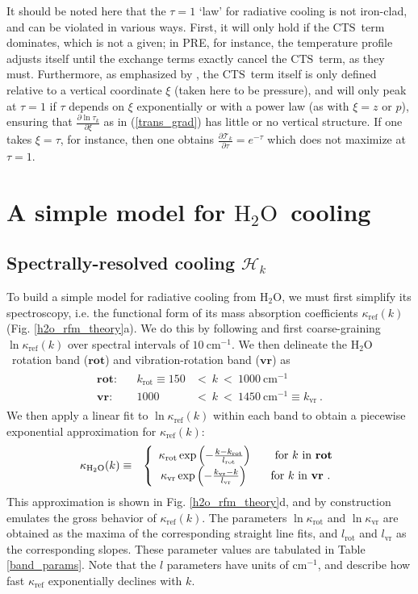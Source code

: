 \documentclass{ametsoc}
\newcommand{\beqa}{\begin{eqnarray}}
\newcommand{\eeqa}{\end{eqnarray}}
\newcommand{\eqnref}[1]{(\ref{#1})}
\newcommand{\cminverse}{\ensuremath{\mathrm{cm^{-1}}}}
\newcommand{\partialder}[2]{\ensuremath{\frac{\partial #1}{\partial #2}}}
\newcommand{\htwo}{\ensuremath{\mathrm{H_2O}}}
\newcommand{\trans}{\ensuremath{\mathcal{T}}}
\newcommand{\ch}{\ensuremath{\mathcal{H}}}
\newcommand{\chk}{\ensuremath{\ch_k}}
\newcommand{\tauk}{\ensuremath{\tau_k}}
\newcommand{\CTS}{\ensuremath{\mathrm{CTS}}}
\newcommand{\kapparef}{\ensuremath{\kappa_{\mathrm{ref}}}}
\newcommand{\kapparot}{\ensuremath{\kappa_{\mathrm{rot}}}}
\newcommand{\kappavr}{\ensuremath{\kappa_{\mathrm{vr}}}}
\newcommand{\krot}{\ensuremath{k_\mathrm{rot}}}
\newcommand{\kvr}{\ensuremath{k_\mathrm{vr}}}
\newcommand{\lrot}{\ensuremath{l_\mathrm{rot}}}
\newcommand{\lvr}{\ensuremath{l_\mathrm{vr}}}
\newcommand{\vr}{\ensuremath{\mathbf{vr}}}
\newcommand{\rot}{\ensuremath{\mathbf{rot}}}
\begin{document}
 It should be noted here that the $\tau=1$ `law' for radiative cooling is not iron-clad, and can be violated in various ways. First, it will only hold if the \CTS\ term dominates, which is not a given; in PRE, for instance, the temperature profile adjusts itself until the exchange terms exactly cancel the \CTS\ term, as they must. Furthermore,  as emphasized by \cite{huang2014}, the \CTS\ term itself is only defined relative to a vertical coordinate $\xi$ (taken here to be pressure),  and  will only peak at $\tau=1$ if $\tau$ depends on $\xi$ exponentially or with a power law (as with $\xi=z$ or $p$), ensuring that $\partialder{\ln \tauk}{\xi}$ as in \eqnref{trans_grad} has little or no vertical structure. If one takes $\xi=\tau$, for instance, then one obtains $\partialder{\trans_k}{\tau} = e^{-\tau}$ which does not maximize at $\tau=1$. 
 
\section{A simple model for  \htwo\ cooling} \label{sec_h2o_theory}

\subsection{Spectrally-resolved cooling \chk} \label{sec_h2o_spectral}
To build a simple model for radiative cooling from \htwo,  we must first simplify its spectroscopy, i.e. the functional form of its mass absorption coefficients $\kapparef(k)$ (Fig. \ref{h2o_rfm_theory}a). We do this by following \cite{wilson2012} and first coarse-graining $\ln \kapparef(k)$ over spectral intervals of $10 \ \cminverse$. We then delineate the  \htwo\ rotation band (\rot) and vibration-rotation band (\vr)  as
\beqa
	\begin{split}
	    \rot :  & & \krot \equiv 150 & <\  k\  < \ 1000\ \cminverse \\
    		\vr : & &  1000 & < \  k\ <\  1450\ \cminverse \equiv \kvr   \ .
	\end{split}
	\label{h2o_bands}
\eeqa
 We then apply a linear fit to $\ln \kapparef(k)$ within each band  to obtain a piecewise exponential approximation for $\kapparef(k)$:
 \beqa
 	\kappa_{\htwo}(k) & \equiv & \left\{ \begin{array}{cr} 
													\kapparot \exp\left(-\frac{k-\krot}{\lrot}\right) \quad \quad \text{for $k$ in \textbf{rot}}  \\
												    \kappavr \exp\left(-\frac{\kvr-k}{\lvr}\right)   \quad \quad \text{for $k$ in \textbf{vr} .}
												      \end{array} \right.          
\label{kappa_h2o}
 \eeqa
This approximation is shown in Fig. \ref{h2o_rfm_theory}d, and by construction emulates the gross behavior of $\kapparef(k)$. The parameters $\ln\kapparot$ and $\ln \kappavr$ are obtained as the maxima of the corresponding straight line fits, and $\lrot$ and $\lvr$ as the corresponding slopes. These parameter values are tabulated in Table \ref{band_params}. Note that the $l$ parameters have units of \cminverse, and describe how fast $\kapparef$ exponentially declines with $k$.
 
\end{document}
